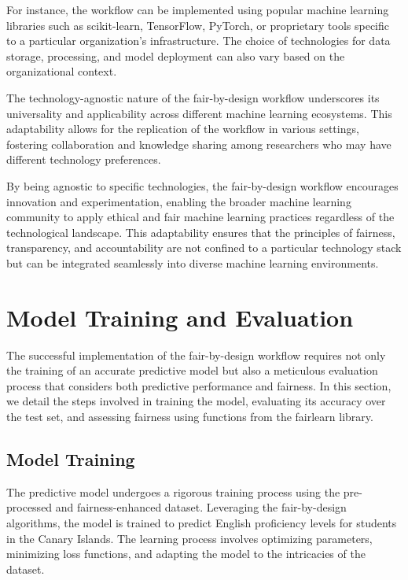 For instance, the workflow can be implemented using popular machine learning libraries such as scikit-learn, TensorFlow, PyTorch, or proprietary tools specific to a particular organization's infrastructure. The choice of technologies for data storage, processing, and model deployment can also vary based on the organizational context.

The technology-agnostic nature of the fair-by-design workflow underscores its universality and applicability across different machine learning ecosystems. This adaptability allows for the replication of the workflow in various settings, fostering collaboration and knowledge sharing among researchers who may have different technology preferences.

By being agnostic to specific technologies, the fair-by-design workflow encourages innovation and experimentation, enabling the broader machine learning community to apply ethical and fair machine learning practices regardless of the technological landscape. This adaptability ensures that the principles of fairness, transparency, and accountability are not confined to a particular technology stack but can be integrated seamlessly into diverse machine learning environments.

\section{Model Training and Evaluation}

The successful implementation of the fair-by-design workflow requires not only the training of an accurate predictive model but also a meticulous evaluation process that considers both predictive performance and fairness. In this section, we detail the steps involved in training the model, evaluating its accuracy over the test set, and assessing fairness using functions from the fairlearn library.

\subsection{Model Training}

The predictive model undergoes a rigorous training process using the pre-processed and fairness-enhanced dataset. Leveraging the fair-by-design algorithms, the model is trained to predict English proficiency levels for students in the Canary Islands. The learning process involves optimizing parameters, minimizing loss functions, and adapting the model to the intricacies of the dataset.

